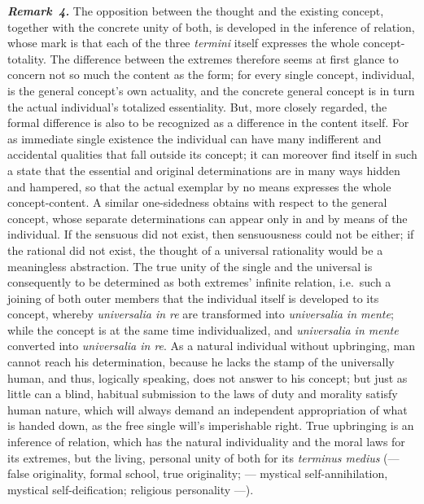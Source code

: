 \documentclass[12pt]{book}
\newcommand{\anm}[1]{\emph{\textbf{Remark~#1.}}}
\begin{document}
\anm{4} The opposition between the thought and the existing concept,
together with the concrete unity of both, is developed in the inference of
relation, whose mark is that each of the three \textit{termini} itself
expresses the whole concept-totality. The difference between the extremes
therefore seems at first glance to concern not so much the content as the
form; for every single concept, individual, is the general concept's own
actuality, and the concrete general concept is in turn the actual
individual's totalized essentiality. But, more closely regarded, the formal
difference is also to be recognized as a difference in the content itself.
For as immediate single existence the individual can have many indifferent
and accidental qualities that fall outside its concept; it can moreover find
itself in such a state that the essential and original determinations are in
many ways hidden and hampered, so that the actual exemplar by no means
expresses the whole concept-content. A similar one-sidedness obtains with
respect to the general concept, whose separate determinations can appear
only in and by means of the individual. If the sensuous did not exist, then
sensuousness could not be either; if the rational did not exist, the thought
of a universal rationality would be a meaningless abstraction. The true
unity of the single and the universal is consequently to be determined as
both extremes' infinite relation, i.e.\ such a joining of both outer members
that the individual itself is developed to its concept, whereby
\textit{universalia in re} are transformed into \textit{universalia in
mente}; while the concept is at the same time individualized, and
\textit{universalia in mente} converted into \textit{universalia in re}. As
a natural individual without upbringing, man cannot reach his determination,
because he lacks the stamp of the universally human, and thus, logically
speaking, does not answer to his concept; but just as little can a blind,
habitual submission to the laws of duty and morality satisfy human nature,
which will always demand an independent appropriation of what is handed
down, as the free single will's imperishable right. True upbringing is an
inference of relation, which has the natural individuality and the moral
laws for its extremes, but the living, personal unity of both for its
\textit{terminus medius} (--- false originality, formal school, true
originality; --- mystical self-annihilation, mystical self-deification;
religious personality ---).
\end{document}

